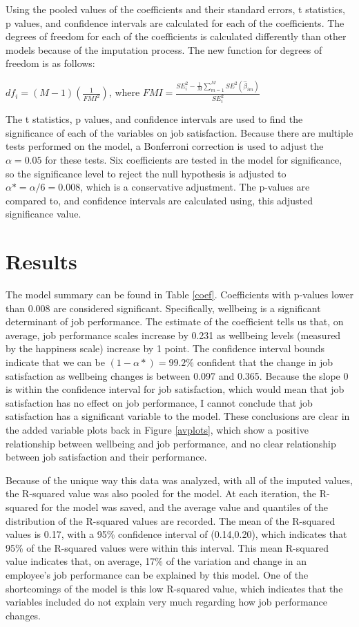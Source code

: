 \documentclass{svproc}
\begin{document}
Using the pooled values of the coefficients and their standard errors, t statistics, p values, and confidence intervals are calculated for each of the coefficients. The degrees of freedom for each of the coefficients is calculated differently than other models because of the imputation process. The new function for degrees of freedom is as follows:

\begin{center}
$df_i = (M-1)(\frac{1}{FMI^2})$, where $FMI = \frac{SE_i^2 - \frac{1}{M}\sum_{m=1}^{M} SE^2(\hat{\beta}_{im})}{{SE}_i^2}$
\end{center}

The t statistics, p values, and confidence intervals are used to find the significance of each of the variables on job satisfaction. Because there are multiple tests performed on the model, a Bonferroni correction is used to adjust the $\alpha=0.05$ for these tests. Six coefficients are tested in the model for significance, so the significance level to reject the null hypothesis is adjusted to $\alpha*=\alpha/6=0.008$, which is a conservative adjustment. The p-values are compared to, and confidence intervals are calculated using, this adjusted significance value.

\section{Results}

The model summary can be found in Table \ref{coef}. Coefficients with p-values lower than $0.008$ are considered significant. Specifically, wellbeing is a significant determinant of job performance. The estimate of the coefficient tells us that, on average, job performance scales increase by 0.231 as wellbeing levels (measured by the happiness scale) increase by 1 point. The confidence interval bounds indicate that we can be $(1-\alpha*)=99.2\%$ confident that the change in job satisfaction as wellbeing changes is between 0.097 and 0.365. Because the slope 0 is within the confidence interval for job satisfaction, which would mean that job satisfaction has no effect on job performance, I cannot conclude that job satisfaction has a significant variable to the model. These conclusions are clear in the added variable plots back in Figure \ref{avplots}, which show a positive relationship between wellbeing and job performance, and no clear relationship between job satisfaction and their performance. 

Because of the unique way this data was analyzed, with all of the imputed values, the R-squared value was also pooled for the model. At each iteration, the R-squared for the model was saved, and the average value and quantiles of the distribution of the R-squared values are recorded. The mean of the R-squared values is 0.17, with a 95\% confidence interval of (0.14,0.20), which indicates that 95\% of the R-squared values were within this interval. This mean R-squared value indicates that, on average, 17\% of the variation and change in an employee's job performance can be explained by this model. One of the shortcomings of the model is this low R-squared value, which indicates that the variables included do not explain very much regarding how job performance changes.
\end{document}
